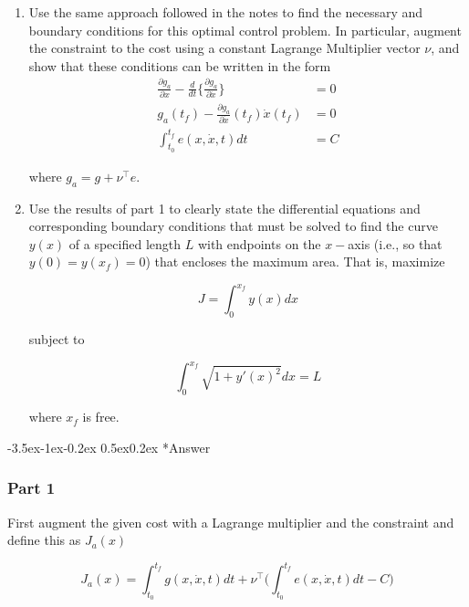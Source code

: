 \documentclass[11pt,letterpaper,onecolumn,notitlepage]{article}
\makeatletter
\renewcommand\subsection{\@startsection{subsection}{1}{\z@}%
{-3.5ex\@plus-1ex\@minus-0.2ex}%
{0.5ex\@plus0.2ex}%
{\fontsize{10pt}{10pt}\selectfont\bfseries\sffamily}}
\makeatother
\begin{document}
  \begin{enumerate}
    \item{%
      Use the same approach followed in the notes to find the necessary and boundary conditions for this optimal control problem.
      In particular, augment the constraint to the cost using a constant Lagrange Multiplier vector $\nu$, and show that these conditions can be written in the form
    }
    \begin{align*}
      \frac{\partial{}g_{a}}{\partial{}x}-\frac{d}{dt}\biggr\{\frac{\partial{}g_{a}}{\partial\dot{x}}\biggr\}&=0 \\
      g_{a}(t_{f})-\frac{\partial{}g_{a}}{\partial\dot{x}}(t_{f})\dot{x}(t_{f})&=0 \\
      \int_{t_{0}}^{t_{f}}e(x,\dot{x},t)dt&=C
    \end{align*}

    where $g_{a}=g+\nu^{\top}e$.

    \item{%
      Use the results of part 1 to clearly state the differential equations and corresponding boundary conditions that must be solved to find the curve $y(x)$ of a specified length $L$ with endpoints on the $x-$axis (i.e., so that $y(0)=y(x_{f})=0$) that encloses the maximum area.
      That is, maximize
    }

    \begin{equation*}
      J=\int_{0}^{x_{f}}y(x)dx
    \end{equation*}

    subject to

    \begin{equation*}
      \int_{0}^{x_{f}}\sqrt{1+y'(x)^{2}}dx=L
    \end{equation*}

    where $x_{f}$ is free.
  \end{enumerate}

  \subsection*{Answer}
  \subsubsection*{Part 1}

  First augment the given cost with a Lagrange multiplier and the constraint and define this as $J_{a}(x)$

  \begin{equation*}
    J_{a}(x)=\int_{t_{0}}^{t_{f}}g(x,\dot{x},t)dt+\nu^{\top}\biggr(\int_{t_{0}}^{t_{f}}e(x,\dot{x},t)dt-C\biggr)
  \end{equation*}
\end{document}
